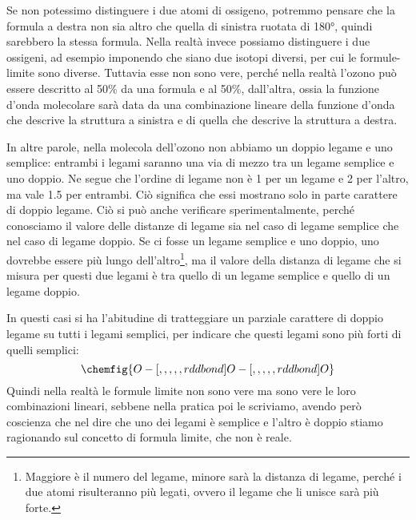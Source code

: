     Se non potessimo distinguere i due atomi di ossigeno, potremmo pensare che la formula a destra non sia altro che quella di sinistra ruotata di 180°, quindi sarebbero la stessa formula. Nella realtà invece possiamo distinguere i due ossigeni, ad esempio imponendo che siano due isotopi diversi, per cui le formule-limite sono diverse. Tuttavia esse non sono vere, perché nella realtà l'ozono può essere descritto al 50\% da una formula e al 50\%, dall'altra, ossia la funzione d'onda molecolare sarà data da una combinazione lineare della funzione d'onda che descrive la struttura a sinistra e di quella che descrive la struttura a destra.

    In altre parole, nella molecola dell'ozono non abbiamo un doppio legame e uno semplice: entrambi i legami saranno una via di mezzo tra un legame semplice e uno doppio. Ne segue che l'ordine di legame non è 1 per un legame e 2 per l'altro, ma vale 1.5  per entrambi. Ciò significa che essi mostrano solo in parte carattere di doppio legame.
    Ciò si può anche verificare sperimentalmente, perché conosciamo il valore delle distanze di legame sia nel caso di legame semplice che nel caso di legame doppio. Se ci fosse un legame semplice e uno doppio, uno dovrebbe essere più lungo dell'altro\footnote{Maggiore è il numero del legame, minore sarà la distanza di legame, perché i due atomi risulteranno più legati, ovvero il legame che li unisce sarà più forte.}, ma il valore della distanza di legame che si misura per questi due legami è tra quello di un legame semplice e quello di un legame doppio.

    In questi casi si ha l'abitudine di tratteggiare un parziale carattere di doppio legame su tutti i legami semplici, per indicare che questi legami sono più forti di quelli semplici:
    $$
    \chemfig{O-[,,,,,rddbond]O-[,,,,,rddbond]O}
    $$
    Quindi nella realtà le formule limite non sono vere ma sono vere le loro combinazioni lineari, sebbene nella pratica poi le scriviamo, avendo però coscienza che nel dire che uno dei legami è semplice e l'altro è doppio stiamo ragionando sul concetto di formula limite, che non è reale.

